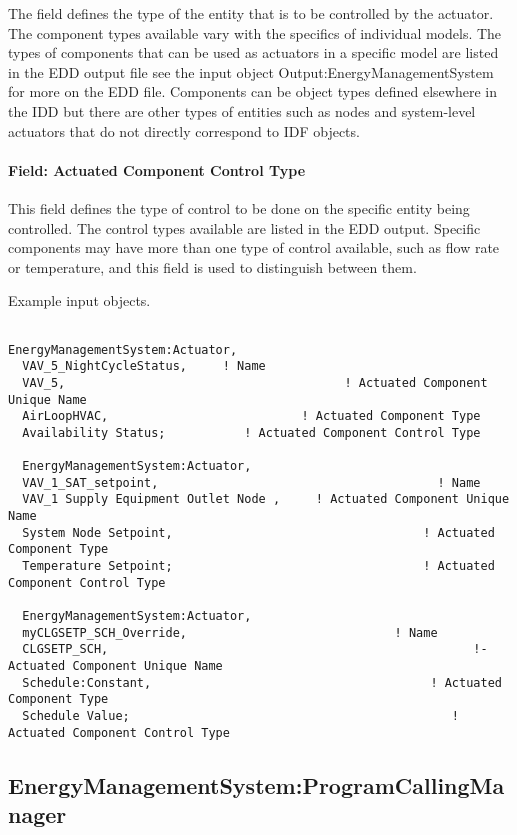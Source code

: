 The field defines the type of the entity that is to be controlled by the actuator. The component types available vary with the specifics of individual models. The types of components that can be used as actuators in a specific model are listed in the EDD output file see the input object Output:EnergyManagementSystem for more on the EDD file. Components can be object types defined elsewhere in the IDD but there are other types of entities such as nodes and system-level actuators that do not directly correspond to IDF objects.

\paragraph{Field: Actuated Component Control Type}\label{field-actuated-component-control-type}

This field defines the type of control to be done on the specific entity being controlled. The control types available are listed in the EDD output. Specific components may have more than one type of control available, such as flow rate or temperature, and this field is used to distinguish between them.

Example input objects.

\begin{lstlisting}

EnergyManagementSystem:Actuator,
  VAV_5_NightCycleStatus,     ! Name
  VAV_5,                                       ! Actuated Component Unique Name
  AirLoopHVAC,                           ! Actuated Component Type
  Availability Status;           ! Actuated Component Control Type

  EnergyManagementSystem:Actuator,
  VAV_1_SAT_setpoint,                                       ! Name
  VAV_1 Supply Equipment Outlet Node ,     ! Actuated Component Unique Name
  System Node Setpoint,                                   ! Actuated Component Type
  Temperature Setpoint;                                   ! Actuated Component Control Type

  EnergyManagementSystem:Actuator,
  myCLGSETP_SCH_Override,                             ! Name
  CLGSETP_SCH,                                                   !- Actuated Component Unique Name
  Schedule:Constant,                                       ! Actuated Component Type
  Schedule Value;                                             ! Actuated Component Control Type
\end{lstlisting}

\subsection{EnergyManagementSystem:ProgramCallingManager}\label{energymanagementsystemprogramcallingmanager}

